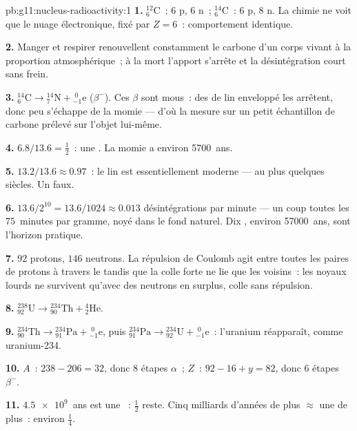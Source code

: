\begin{solution}{pb:g11:nucleus-radioactivity:1}
\textbf{1.} ${}^{12}_{6}\mathrm{C}$~: $6$ p, $6$ n~; ${}^{14}_{6}\mathrm{C}$~:
$6$ p, $8$ n. La chimie ne voit que le nuage électronique, fixé par
$Z = 6$~: comportement identique.

\textbf{2.} Manger et respirer renouvellent constamment le carbone d'un
corps vivant à la proportion atmosphérique~; à la mort l'apport
s'arrête et la désintégration court sans frein.

\textbf{3.} ${}^{14}_{6}\mathrm{C} \to {}^{14}_{7}\mathrm{N} +
{}^{\;0}_{-1}\mathrm{e}$ ($\beta^-$). Ces $\beta$ sont mous~: des
 de lin enveloppé les arrêtent, donc
peu s'échappe de la momie --- d'où la mesure sur un petit échantillon
de carbone prélevé sur l'objet lui-même.

\textbf{4.} $6.8/13.6 = \frac12$~: une
. La momie a environ
\num{5700}~ans.

\textbf{5.} $13.2/13.6 \approx 0.97$~: le lin est essentiellement
moderne --- au plus quelques siècles. Un faux.

\textbf{6.} $13.6/2^{10} = 13.6/1024 \approx 0.013$ désintégrations par
minute --- un coup toutes les $75$~minutes par gramme, noyé dans le fond
naturel. Dix , environ \num{57000}~ans, sont l'horizon
pratique.

\textbf{7.} $92$ protons, $146$ neutrons. La répulsion de Coulomb agit
entre toutes les paires de protons à travers le
 tandis que la colle forte ne
lie que les voisins~: les noyaux lourds ne survivent qu'avec des
neutrons en surplus, colle sans répulsion.

\textbf{8.} ${}^{238}_{92}\mathrm{U} \to {}^{234}_{90}\mathrm{Th} +
{}^{4}_{2}\mathrm{He}$.

\textbf{9.} ${}^{234}_{90}\mathrm{Th} \to {}^{234}_{91}\mathrm{Pa} +
{}^{\;0}_{-1}\mathrm{e}$, puis ${}^{234}_{91}\mathrm{Pa} \to
{}^{234}_{92}\mathrm{U} + {}^{\;0}_{-1}\mathrm{e}$~: l'uranium réapparaît,
comme uranium-234.

\textbf{10.} $A$~: $238 - 206 = 32$, donc $8$ étapes $\alpha$~; $Z$~:
$92 - 16 + y = 82$, donc $6$ étapes $\beta^-$.

\textbf{11.} $\num{4.5e9}$~ans est une
~: $\frac12$ reste. Cinq
milliards d'années de plus $\approx$ une
 de plus~: environ
$\frac14$.


\end{solution}

